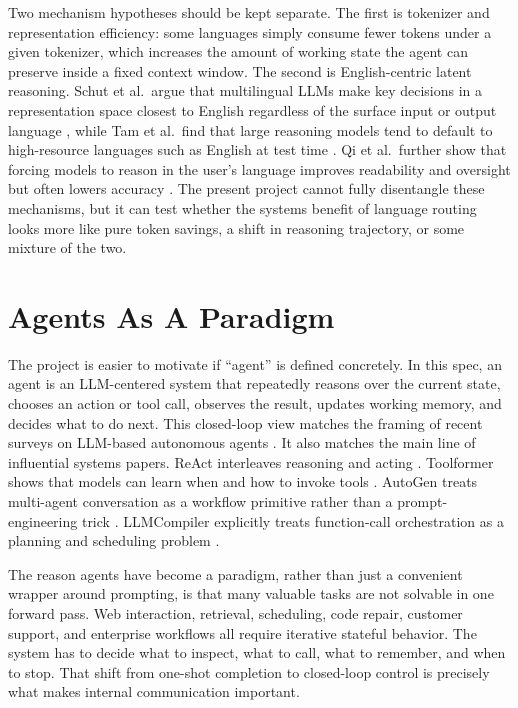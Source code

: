 \documentclass[11pt]{article}
\begin{document}
Two mechanism hypotheses should be kept separate. The first is tokenizer and representation efficiency: some languages simply consume fewer tokens under a given tokenizer, which increases the amount of working state the agent can preserve inside a fixed context window. The second is English-centric latent reasoning. Schut et al.\ argue that multilingual LLMs make key decisions in a representation space closest to English regardless of the surface input or output language \cite{schut2025english}, while Tam et al.\ find that large reasoning models tend to default to high-resource languages such as English at test time \cite{tam2025languagematters}. Qi et al.\ further show that forcing models to reason in the user's language improves readability and oversight but often lowers accuracy \cite{qi2025yourlanguage}. The present project cannot fully disentangle these mechanisms, but it can test whether the systems benefit of language routing looks more like pure token savings, a shift in reasoning trajectory, or some mixture of the two.

\section{Agents As A Paradigm}

The project is easier to motivate if ``agent'' is defined concretely. In this spec, an agent is an LLM-centered system that repeatedly reasons over the current state, chooses an action or tool call, observes the result, updates working memory, and decides what to do next. This closed-loop view matches the framing of recent surveys on LLM-based autonomous agents \cite{wang2023surveyagents}. It also matches the main line of influential systems papers. ReAct interleaves reasoning and acting \cite{yao2023react}. Toolformer shows that models can learn when and how to invoke tools \cite{schick2023toolformer}. AutoGen treats multi-agent conversation as a workflow primitive rather than a prompt-engineering trick \cite{wu2023autogen}. LLMCompiler explicitly treats function-call orchestration as a planning and scheduling problem \cite{kim2023llmcompiler}.

The reason agents have become a paradigm, rather than just a convenient wrapper around prompting, is that many valuable tasks are not solvable in one forward pass. Web interaction, retrieval, scheduling, code repair, customer support, and enterprise workflows all require iterative stateful behavior. The system has to decide what to inspect, what to call, what to remember, and when to stop. That shift from one-shot completion to closed-loop control is precisely what makes internal communication important.
\end{document}
